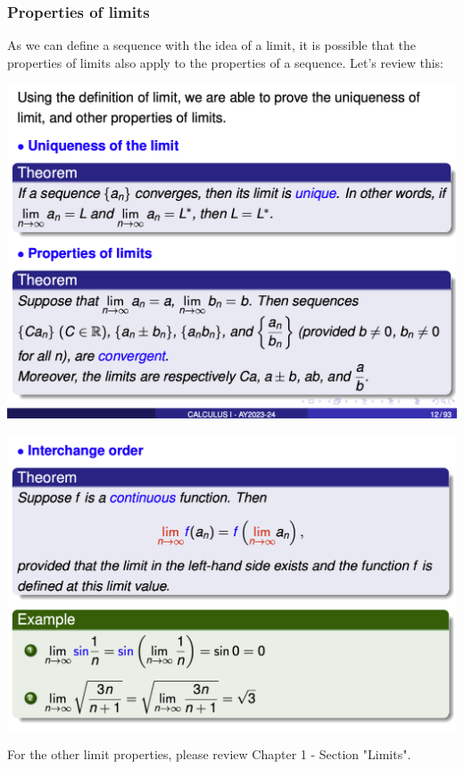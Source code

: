 \documentclass{article}
\begin{document}
\subsubsection{Properties of limits}
As we can define a sequence with the idea of a limit, it is possible that the properties of limits also apply to the properties of a sequence. Let's review this: 
\begin{center}
\includegraphics[scale = .55]{Screenshot 2023-12-06 at 3.53.51 PM.png}    

\includegraphics[scale = .45]{Screenshot 2023-12-06 at 3.59.49 PM.png}
\end{center}
For the other limit properties, please review Chapter 1  - Section "Limits".
\end{document}
